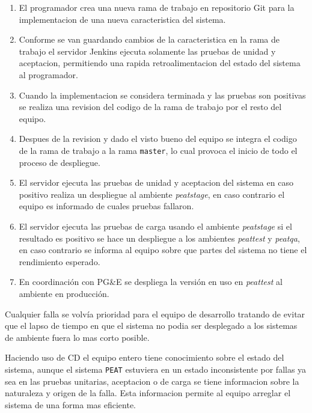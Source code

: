 \begin{enumerate}
\item El programador crea una nueva rama de trabajo en repositorio Git para la
  implementacion de una nueva caracteristica del sistema.
\item Conforme se van guardando cambios de la caracteristica en la rama de trabajo
  el servidor Jenkins ejecuta solamente las pruebas de unidad y aceptacion,
  permitiendo una rapida retroalimentacion del estado del sistema al programador.
\item Cuando la implementacion se considera terminada y las pruebas son positivas
  se realiza una revision del codigo de la rama de trabajo por el resto del
  equipo.
\item Despues de la revision y dado el visto bueno del equipo se integra el
  codigo de la rama de trabajo a la rama \texttt{master}, lo cual provoca el
  inicio de todo el proceso de despliegue.
\item El servidor ejecuta las pruebas de unidad y aceptacion del sistema en
  caso positivo realiza un despliegue al ambiente \textit{peatstage}, en caso
  contrario el equipo es informado de cuales pruebas fallaron.
\item El servidor ejecuta las pruebas de carga usando el ambiente \textit{peatstage}
  si el resultado es positivo se hace un despliegue a los ambientes \textit{peattest}
  y \textit{peatqa}, en caso contrario se informa al equipo sobre que partes del
  sistema no tiene el rendimiento esperado.
\item En coordinación con PG\&E se despliega la versión en uso en \textit{peattest}
  al ambiente en producción.
\end{enumerate}

Cualquier falla se volvía prioridad para el equipo de desarrollo tratando de evitar
que el lapso de tiempo en que el sistema no podia ser desplegado a los sistemas de ambiente fuera lo mas corto posible. 

Haciendo uso de CD el equipo entero tiene conocimiento sobre el estado del sistema,
aunque el sistema \texttt{PEAT} estuviera en un estado inconsistente por fallas ya
sea en las pruebas unitarias, aceptacion o de carga se tiene informacion sobre la
naturaleza y origen de la falla. Esta informacion permite al equipo arreglar el
sistema de una forma mas eficiente.
